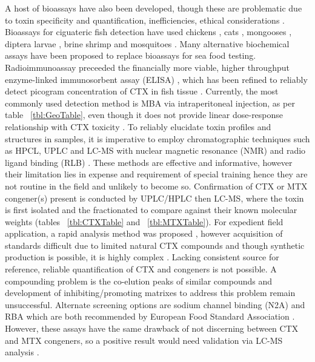 \documentclass[12pt]{article}
\begin{document}
A host of bioassays have also been developed, though these are problematic due to toxin specificity and quantification, inefficiencies, ethical considerations \cite{dickey2010ciguatera}.
Bioassays for ciguateric fish detection have used chickens \cite{}, cats \cite{larson1967ciguatera}, mongooses \cite{hokama1977radioimmunoassay}, diptera larvae \cite{labrousse1996toxicological}, brine shrimp \cite{granade1976ciguatera} and mosquitoes \cite{bagnis1987use}.
Many alternative biochemical assays have been proposed to replace bioassays for sea food testing. Radioimmunoassay \cite{hokama1977radioimmunoassay} preceeded the financially more viable, higher throughput enzyme-linked immunosorbent assay (ELISA) \cite{hokama1983rapid}, which has been refined to reliably detect picogram concentration of CTX in fish tissue \cite{campora2008detection,campora2010evaluating}. Currently, the most commonly used detection method is MBA via intraperitoneal injection, as per table ~\ref{tbl:GeoTable}, even though it does not provide linear dose-response relationship with CTX toxicity \cite{hoffman1983mouse}. 
To reliably elucidate toxin profiles and structures in samples, it is imperative to employ chromatographic techniques such as HPCL, UPLC and LC-MS with nuclear magnetic resonance (NMR) \cite{legrand1989isolation,murata1990structures,murata1990structures,satake1996isolation,diogened2014chemistry} and radio ligand binding (RLB) \cite{hamilton2002multiple,hamilton2002isolation}. These methods are effective and informative, however their limitation lies in expense and requirement of special training hence they are not routine in the field and unlikely to become so. %
Confirmation of CTX or MTX congener(s) present is conducted by UPLC/HPLC then LC-MS, where the toxin is first isolated and the fractionated to compare against their known molecular weights (tables ~\ref{tbl:CTXTable} and ~\ref{tbl:MTXTable}). For expedient field application, a rapid analysis method was proposed \cite{lewis2009rapid}, however acquisition of standards difficult due to limited natural CTX compounds \cite{berdalet2012global} and though synthetic production is possible, it is highly complex \cite{hirama2001total}. Lacking consistent source for reference, reliable quantification of CTX and congeners is not possible. A compounding problem is the co-elution peaks of similar compounds and development of inhibiting/promoting matrixes to address this problem remain unsuccessful.
Alternate screening options are sodium channel binding (N2A) \cite{dickey2010ciguatera} and RBA \cite{poli1997identification,darius2007ciguatera} which are both recommended by European Food Standard Association \cite{}. %
However, these assays have the same drawback of not discerning between CTX and MTX congeners, so a positive result would need validation via LC-MS analysis \cite{diogened2014chemistry,mak2013pacific}. 
\end{document}
